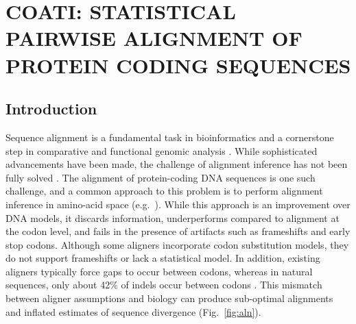 \chapter{COATI: STATISTICAL PAIRWISE ALIGNMENT OF PROTEIN CODING SEQUENCES}
\label{ch:alignpair}


\section{Introduction}

Sequence alignment is a fundamental task in bioinformatics and a cornerstone step in comparative and functional genomic analysis \citep{sequence_alignment_rosenberg_2009}. While sophisticated advancements have been made, the challenge of alignment inference has not been fully solved \citep{art_morrison_2015}.
%
The alignment of protein-coding DNA sequences is one such challenge, and a common approach to this problem is to perform alignment inference in amino-acid space (e.g.\ \citealt{bininda2005transalign,abascal2010translatorx}).
While this approach is an improvement over DNA models, it discards information, underperforms compared to alignment at the codon level, and fails in the presence of artifacts such as frameshifts and early stop codons.
Although some aligners incorporate codon substitution models, they do not support frameshifts or lack a statistical model.
In addition, existing aligners typically force gaps to occur between codons, whereas in natural sequences, only about 42\% of indels occur between codons \citep{taylor2004occurrence,zhu2022profiling}.
This mismatch between aligner assumptions and biology can produce sub-optimal alignments and inflated estimates of sequence divergence (Fig.\ \ref{fig:aln}).

